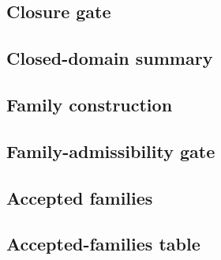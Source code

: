 \subsection{Closure gate}\label{subsec:closure-gate}


\subsection{Closed-domain summary}\label{subsec:closed-domain-summary}

% 

\subsection{Family construction}\label{subsec:family-construction}


\subsection{Family-admissibility gate}\label{subsec:family-admissibility-gate}


\subsection{Accepted families}\label{subsec:accepted-families}


\subsection{Accepted-families table}\label{subsec:accepted-families-table}

% 
